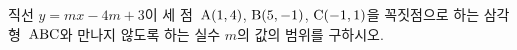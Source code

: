 직선 $y=mx-4m+3$이 세 점~$\mathrm{A}(1{,}\mkern3mu\mathopen{}4)$, $\mathrm{B}(5{,}\mkern3mu\mathopen{}-1)$, $\mathrm{C}(-1{,}\mkern3mu\mathopen{}1)$을 꼭짓점으로 하는 삼각형~$\mathrm{ABC}$와 만나지 않도록 하는 실수 $m$의 값의 범위를 구하시오.
